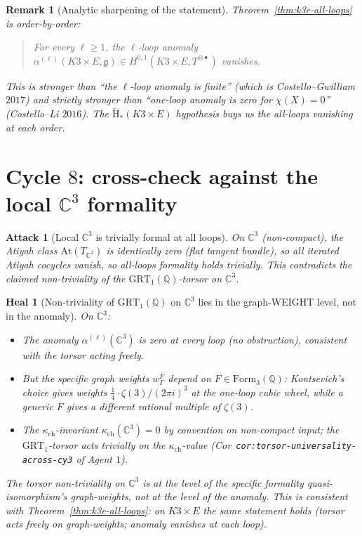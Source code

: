 \documentclass[11pt]{article}
\newtheorem{remark}[theorem]{Remark}
\newtheorem{attack}[theorem]{Attack}
\newtheorem{heal}[theorem]{Heal}
\providecommand{\At}{\mathrm{At}}
\providecommand{\fg}{\mathfrak{g}}
\providecommand{\CC}{\mathbb{C}}
\providecommand{\QQ}{\mathbb{Q}}
\providecommand{\kch}{\kappa_{\mathrm{ch}}}
\providecommand{\GRT}{\mathrm{GRT}}
\providecommand{\Form}{\mathrm{Form}}
\begin{document}
\begin{remark}[Analytic sharpening of the statement]
\label{rem:analytic-sharpening}
Theorem~\ref{thm:k3e-all-loops} is order-by-order:
\begin{quote}
For every $\ell \geq 1$, the $\ell$-loop anomaly
$\alpha^{(\ell)}(K3 \times E, \fg) \in H^{0,1}(K3 \times E,
T^{\otimes \bullet})$ vanishes.
\end{quote}
This is stronger than ``the $\ell$-loop anomaly is finite'' (which
is Costello--Gwilliam $2017$) and strictly stronger than
``one-loop anomaly is zero for $\chi(X) = 0$'' (Costello--Li
$2016$).  The $\widetilde{\mathrm{H}}_*(K3 \times E)$ hypothesis
buys us the all-loops vanishing at each order.
\end{remark}

\section{Cycle $8$:  cross-check against the local $\CC^3$ formality}
\label{sec:cycle-8-local-c3}

\begin{attack}[Local $\CC^3$ is trivially formal at all loops]
\label{att:local-c3-trivial}
On $\CC^3$ (non-compact), the Atiyah class $\At(T_{\CC^3})$ is
identically zero (flat tangent bundle), so all iterated Atiyah
cocycles vanish, so all-loops formality holds trivially.  This
contradicts the claimed non-triviality of the $\GRT_1(\QQ)$-torsor
on $\CC^3$.
\end{attack}

\begin{heal}[Non-triviality of $\GRT_1(\QQ)$ on $\CC^3$ lies in the
graph-WEIGHT level, not in the anomaly]
\label{heal:grt-c3}
On $\CC^3$:
\begin{itemize}
\item The anomaly $\alpha^{(\ell)}(\CC^3)$ is zero at every loop
(no obstruction), consistent with the torsor acting freely.
\item But the specific graph weights $w_\Gamma^F$ depend on
$F \in \Form_3(\QQ)$: Kontsevich's choice gives weights
$\frac{1}{4} \cdot \zeta(3)/(2\pi i)^3$ at the one-loop cubic
wheel, while a generic $F$ gives a different rational multiple of
$\zeta(3)$.
\item The $\kch$-invariant $\kch(\CC^3) = 0$ by convention on
non-compact input; the $\GRT_1$-torsor acts trivially on the
$\kch$-value (Cor~\texttt{cor:torsor-universality-across-cy3} of
Agent $1$).
\end{itemize}
The torsor non-triviality on $\CC^3$ is at the level of the specific
formality quasi-isomorphism's graph-weights, not at the level of
the anomaly.  This is consistent with Theorem~\ref{thm:k3e-all-loops}:
on $K3 \times E$ the same statement holds (torsor acts freely on
graph-weights; anomaly vanishes at each loop).
\end{heal}
\end{document}

